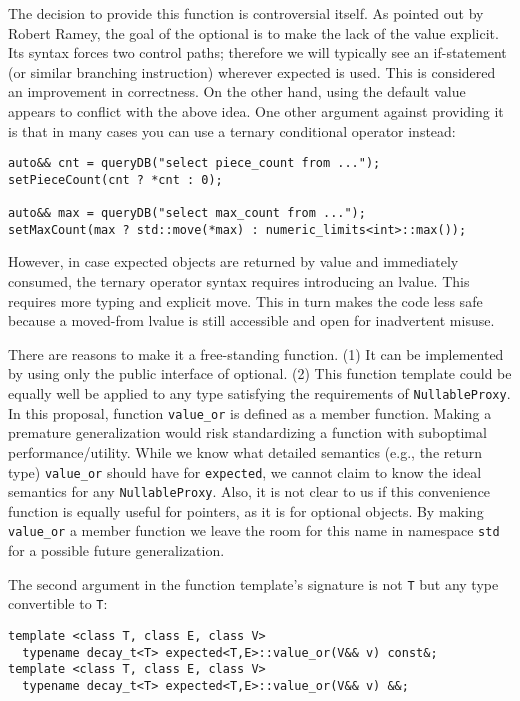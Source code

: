 \documentclass[a4paper,10pt]{article}
\newcommand{\cpp}[1]{\lstinline{#1}}
\begin{document}
The decision to provide this function is controversial itself. As pointed out by Robert Ramey, the goal of the optional is to make the lack of the value explicit. Its syntax forces two control paths; therefore we will typically see an if-statement (or similar branching instruction) wherever expected is used. This is considered an improvement in correctness. On the other hand, using the default value appears to conflict with the above idea. One other argument against providing it is that in many cases you can use a ternary conditional operator instead:

\begin{lstlisting}
auto&& cnt = queryDB("select piece_count from ...");
setPieceCount(cnt ? *cnt : 0);

auto&& max = queryDB("select max_count from ...");
setMaxCount(max ? std::move(*max) : numeric_limits<int>::max());
\end{lstlisting}

However, in case expected objects are returned by value and immediately consumed, the ternary operator syntax requires introducing an lvalue. This requires more typing and explicit move. This in turn makes the code less safe because a moved-from lvalue is still accessible and open for inadvertent misuse.

There are reasons to make it a free-standing function. (1) It can be implemented by using only the public interface of optional. (2) This function template could be equally well be applied to any type satisfying the requirements of \cpp{NullableProxy}. In this proposal, function \cpp{value_or} is defined as a member function. Making a premature generalization would risk standardizing a function with suboptimal performance/utility. While we know what detailed semantics (e.g., the return type) \cpp{value_or} should have for \cpp{expected}, we cannot claim to know the ideal semantics for any \cpp{NullableProxy}. Also, it is not clear to us if this convenience function is equally useful for pointers, as it is for optional objects. By making \cpp{value_or} a member function we leave the room for this name in namespace \cpp{std} for a possible future generalization.

The second argument in the function template's signature is not \cpp{T} but any type convertible to \cpp{T}:

\begin{lstlisting}
template <class T, class E, class V> 
  typename decay_t<T> expected<T,E>::value_or(V&& v) const&;
template <class T, class E, class V> 
  typename decay_t<T> expected<T,E>::value_or(V&& v) &&;
\end{lstlisting}
\end{document}
